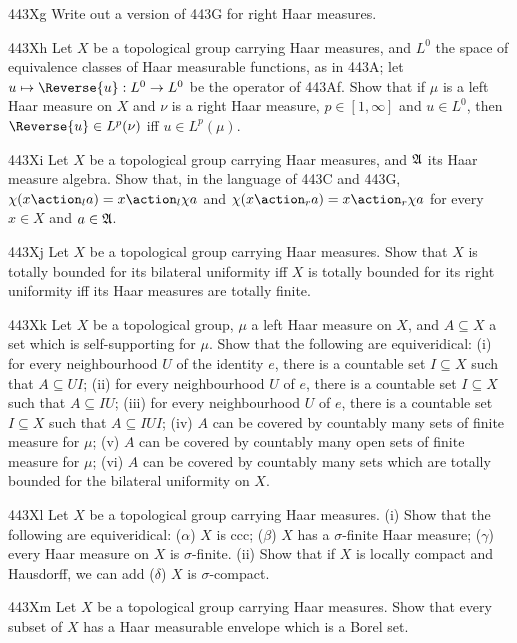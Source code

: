 {\spheader 443Xg Write out a version of 443G for right Haar measures.

\spheader 443Xh Let $X$ be a topological group carrying Haar measures,
and $L^0$ the space of equivalence classes of Haar measurable functions,
as in 443A;  let $u\mapsto\Reverse{u}:L^0\to L^0$ be the operator of 443Af.
Show that if
$\mu$ is a left Haar measure on $X$ and $\nu$ is a right Haar measure,
$p\in[1,\infty]$ and $u\in L^0$, then $\Reverse{u}\in L^p(\nu)$ iff
$u\in L^p(\mu)$.

\spheader 443Xi Let $X$ be a topological group carrying Haar measures,
and $\frak A$ its Haar measure algebra.   Show that, in the language of
443C and 443G, $\chi(x\action_la)=x\action_l\chi a$ and
$\chi(x\action_ra)=x\action_r\chi a$ for every $x\in X$ and
$a\in\frak A$.

\spheader 443Xj Let $X$ be a topological group carrying Haar measures.
Show that $X$ is totally bounded for its bilateral uniformity
iff $X$ is totally bounded for its right uniformity iff its Haar measures are totally finite.

\spheader 443Xk Let $X$ be a topological group, $\mu$ a left Haar
measure on $X$, and $A\subseteq X$ a set which is self-supporting for
$\mu$.   Show that the following are equiveridical:  (i) for every
neighbourhood $U$ of the identity $e$, there is a countable set
$I\subseteq X$ such that $A\subseteq UI$;  (ii) for every neighbourhood
$U$ of $e$, there is a countable set $I\subseteq X$ such that
$A\subseteq IU$;
(iii) for every neighbourhood $U$ of $e$, there is a countable set
$I\subseteq X$ such that $A\subseteq IUI$;   (iv) $A$ can be covered by
countably many sets of finite measure for $\mu$;  (v) $A$ can be covered
by countably many open sets of finite measure for $\mu$;  (vi) $A$ can
be covered by countably many sets which are totally bounded for the
bilateral uniformity on $X$.

\sqheader 443Xl Let $X$ be a topological group carrying Haar measures.
(i) Show that the following are equiveridical:  ($\alpha$) $X$ is ccc;
($\beta$) $X$ has a $\sigma$-finite Haar measure;  ($\gamma$) every Haar
measure on $X$ is $\sigma$-finite.
(ii) Show that if $X$ is locally compact and Hausdorff, we can add
($\delta$) $X$ is $\sigma$-compact.

\spheader 443Xm Let $X$ be a topological group carrying Haar measures.
Show that every subset of $X$ has a Haar measurable envelope which is a
Borel set.

}
